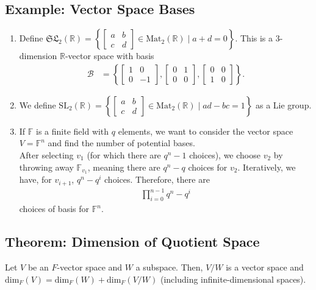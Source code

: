\documentclass[8pt]{extarticle}
\newcommand{\R}{\mathbb{R}}
\begin{document}
  \subsection{Example: Vector Space Bases}%
  \begin{enumerate}[(1)]
    \item Define $\mathfrak{SL}_2(\R) = \left\{ \begin{bmatrix}a&b\\c&d\end{bmatrix}\in \text{Mat}_2(\R)\mid a+d = 0\right\}$. This is a 3-dimension $\R$-vector space with basis
      \begin{align*}
        \mathcal{B} &= \left\{ \begin{bmatrix}1&0\\0&-1\end{bmatrix}, \begin{bmatrix}0&1\\0&0\end{bmatrix}, \begin{bmatrix}0&0\\1&0\end{bmatrix}\right\}.
      \end{align*}
    \item We define $\text{SL}_2(\R) = \left\{ \begin{bmatrix}a&b\\c&d\end{bmatrix}\in \text{Mat}_2(\R)\mid ad-bc = 1\right\}$ as a Lie group.
    \item If $\mathbb{F}$ is a finite field with $q$ elements, we want to consider the vector space $V = \mathbb{F}^n$ and find the number of potential bases.\\

      After selecting $v_1$ (for which there are $q^n-1$ choices), we choose $v_2$ by throwing away $\mathbb{F}_{v_1}$, meaning there are $q^n - q$ choices for $v_2$. Iteratively, we have, for $v_{i+1}$, $q^{n}-q^i$ choices. Therefore, there are 
      \begin{align*}
        \prod_{i=0}^{n-1}q^n-q^i
      \end{align*}
      choices of basis for $\mathbb{F}^n$.
  \end{enumerate}
  \subsection{Theorem: Dimension of Quotient Space}%
  Let $V$ be an $F$-vector space and $W$ a subspace. Then, $V/W$ is a vector space and $\text{dim}_F(V) = \text{dim}_F(W) + \text{dim}_F(V/W)$ (including infinite-dimensional spaces).\\
\end{document}
